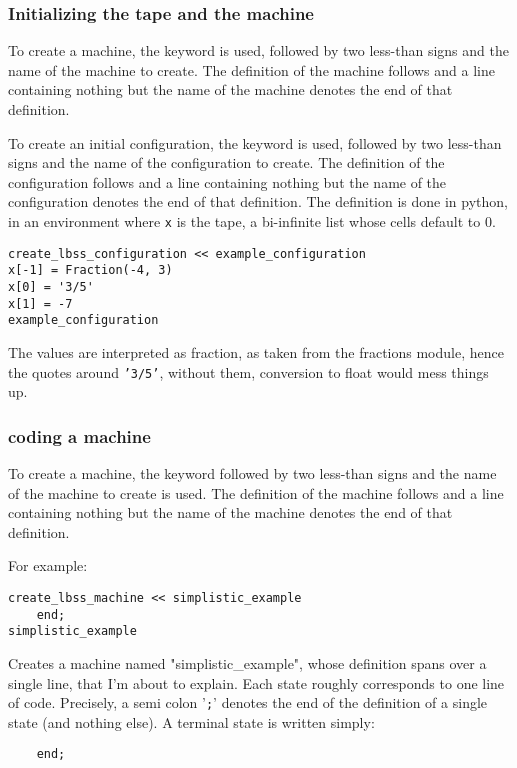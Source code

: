 \subsubsection{Initializing the tape and the machine}
To create a machine, the keyword \functionCreateRLTMmachine is used, followed by two less-than signs and the name of the machine to create.
The definition of the machine follows and a line containing nothing but the name of the machine denotes the end of  that definition.


To create an initial configuration, the keyword \functionCreateRLTMconfiguration is used, followed by two less-than signs and the name of the configuration to create.
The definition of the configuration follows and a line containing nothing but the name of the configuration denotes the end of  that definition.
The definition is done in python, in an environment where \texttt{x} is the tape, a bi-infinite list whose cells default to 0.

\begin{verbatim}
create_lbss_configuration << example_configuration
x[-1] = Fraction(-4, 3)
x[0] = '3/5'
x[1] = -7
example_configuration
\end{verbatim}
The values are interpreted as fraction, as taken from the fractions module, hence the quotes around \texttt{'3/5'}, without them, conversion to float would mess things up.

\subsubsection{coding a machine}

To create a machine, the keyword \functionCreateRLTMmachine followed by two less-than signs and the name of the machine to create is used.
The definition of the machine follows and a line containing nothing but the name of the machine denotes the end of  that definition.

For example:
\begin{verbatim}
create_lbss_machine << simplistic_example
	end;
simplistic_example
\end{verbatim}

Creates a machine named "simplistic\_example", whose definition spans over a single line, that I'm about to explain.
Each state roughly corresponds to one line of code.
Precisely, a semi colon '\texttt{;}' denotes the end of the definition of a single state (and nothing else).
A terminal state is written simply:
\begin{verbatim}
	end;
\end{verbatim}


